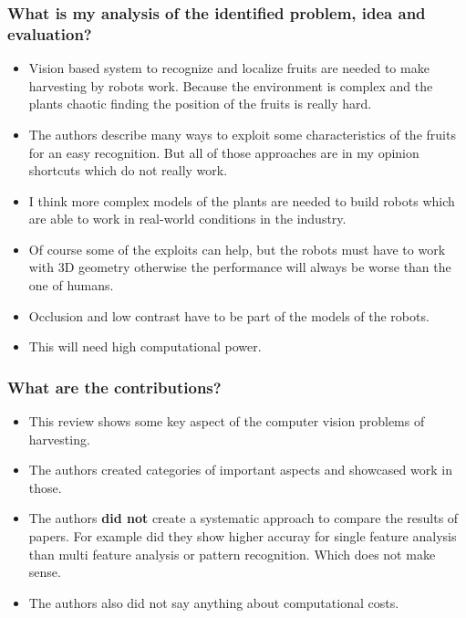     \subsubsection*{What is my analysis of the identified problem, idea and evaluation?}
    \begin{itemize}
        \item Vision based system to recognize and localize fruits are needed to make harvesting by robots work. Because the environment is complex and the plants chaotic finding the position of the fruits is really hard.
        \item The authors describe many ways to exploit some characteristics of the fruits for an easy recognition. But all of those approaches are in my opinion shortcuts which do not really work.
        \item I think more complex models of the plants are needed to build robots which are able to work in real-world conditions in the industry.
        \item Of course some of the exploits can help, but the robots must have to work with 3D geometry otherwise the performance will always be worse than the one of humans. 
        \item Occlusion and low contrast have to be part of the models of the robots.
        \item This will need high computational power.
    \end{itemize}
    \subsubsection*{What are the contributions?}
    \begin{itemize}
        \item This review shows some key aspect of the computer vision problems of harvesting. 
        \item The authors created categories of important aspects and showcased work in those.
        \item The authors \textbf{did not} create a systematic approach to compare the results of papers. For example did they show higher accuray for single feature analysis than multi feature analysis or pattern recognition. Which does not make sense.
        \item The authors also did not say anything about computational costs.
    \end{itemize}
